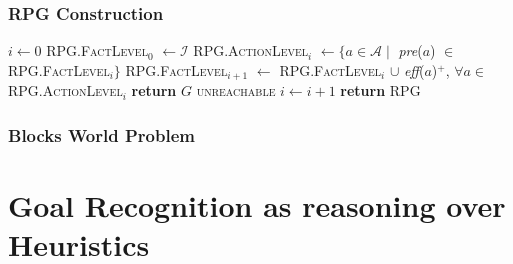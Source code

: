 \documentclass{beamer}
\begin{document}
	\begin{frame}[c]\frametitle{RPG Construction}
		\begin{algorithmic}[1]
			\small
		    		\State $i \gets 0$
		    		\State \textsc{RPG.FactLevel$_{0}$} $\gets \mathcal{I}$
		    			\State \textsc{RPG.ActionLevel$_{i}$} $\gets \lbrace a \in \mathcal{A} \mid$ \textit{pre}($a$) $\in$ \textsc{RPG.FactLevel$_{i}$}$\rbrace$
		    			\State \textsc{RPG.FactLevel$_{i+1}$} $\gets$ \textsc{RPG.FactLevel$_{i}$} $\cup$ \textit{eff}($a$)$^+$, $\forall a \in$ \textsc{RPG.ActionLevel$_{i}$}
						\State \textbf{return} $G$ \textsc{unreachable} 
					\EndIf
		    			\State $i \gets i + 1$
		    		\EndWhile
		        \State \textbf{return} \textsc{RPG}
		    \EndFunction
		\end{algorithmic}
	\end{frame}
	
	\begin{frame}[c]\frametitle{Blocks World Problem}
		
	\end{frame}
\fi

	
\section{Goal Recognition as reasoning over Heuristics}
\end{document}
